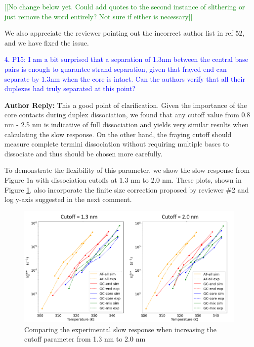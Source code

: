 \documentclass[11pt,a4paper]{letter} %
\newcommand*{\rood}[1]{{\color{red}{#1}}}
\newcommand*{\noteg}[1]{\textcolor{green}{[[#1]]}}		%
\begin{document}
\noteg{No change below yet. Could add quotes to the second instance of slithering or just remove the word entirely? Not sure if either is necessary}

\rood{``Out-of-register states for 5$^\prime$-GCGCGC-3$^\prime$ hexamers were identified as deep kinetic traps along the hybridization pathway and ``slithering'' through these states did not provide a significant hybridization pathway compared to an alternative ``zippering'' mechanism. (In contrast, out-of-register slithering and in-register zippering served as two parallel pathways for hybridization of 5$^\prime$-GGGGGG-3$^\prime$.)'' }

We also appreciate the reviewer pointing out the incorrect author list in ref 52, and we have fixed the issue.

\textcolor{blue}{4. P15: I am a bit surprised that a separation of 1.3nm between the central base pairs is enough to guarantee strand separation, given that frayed end can separate by 1.3nm when the core is intact. Can the authors verify that all their duplexes had truly separated at this point?}

\textbf{Author Reply:}   This a good point of clarification. Given the importance of the core contacts during duplex dissociation, we found that any cutoff value from 0.8 nm - 2.5 nm is indicative of full dissociation and yields very similar results when calculating the slow response. On the other hand, the fraying cutoff should measure complete termini dissociation without requiring multiple bases to dissociate and thus should be chosen more carefully. 

To demonstrate the flexibility of this parameter, we show the slow response from Figure 1a with dissociation cutoffs at 1.3 nm to 2.0 nm. These plots, shown in Figure \ref{fig:compare_cutoffs}, also incorporate the finite size correction proposed by reviewer \#2 and log y-axis suggested in the next comment.

\begin{figure}[ht!]
	\begin{center}
        \includegraphics[width=\textwidth]{cover_letter/revision_figures/slow_response_compare_cutoff.png}
        \caption{Comparing the experimental slow response when increasing the cutoff parameter from 1.3 nm to 2.0 nm}
        \label{fig:compare_cutoffs}
	\end{center}
\end{figure}
\end{document}
